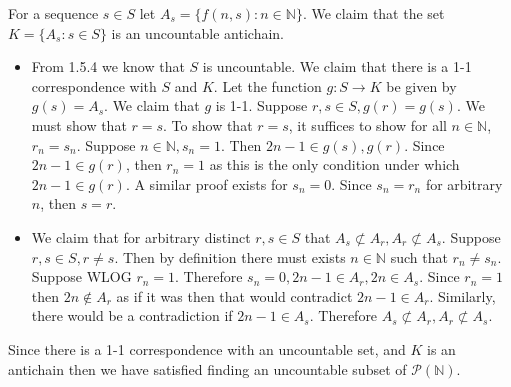 \documentclass[12pt, letterpaper]{article}
\newcommand{\N}{\mathbb{N}}
\newcommand{\Po}{\mathcal{P}}
\begin{document}
\begin{enumerate}
\begin{enumerate}
$$				$$
				For a sequence $s \in S$ let $A_s = \{f(n,s) : n \in \N\}$.  We claim that the set $K = \{A_s : s \in S\}$ is an uncountable antichain.  
				\begin{itemize}
					\item From 1.5.4 we know that $S$ is uncountable.  We claim that there is a 1-1 correspondence with $S$ and $K$.  Let the function $g: S \to K$ be given by $g(s) = A_s$. We claim that $g$ is 1-1.  Suppose $r,s \in S, g(r) = g(s)$.  We must show that $r = s$.  To show that $r=s$, it suffices to show for all $n \in \N$, $r_n = s_n$.  Suppose $n \in \N, s_n = 1$.  Then $2n-1 \in g(s), g(r)$.  Since $2n-1 \in g(r)$, then $r_n = 1$ as this is the only condition under which $2n-1 \in g(r)$.  A similar proof exists for $s_n = 0$.  Since $s_n = r_n$ for arbitrary $n$, then $s = r$.
					\item We claim that for arbitrary distinct $r,s \in S$ that $A_s \not \subset A_r, A_r \not \subset A_s$.  Suppose $r,s \in S, r \neq s$.  Then by definition there must exists $n \in \N$ such that $r_n \neq s_n$.  Suppose WLOG $r_n = 1$.  Therefore $s_n = 0, 2n - 1\in A_r, 2n \in A_s$.  Since $r_n = 1$ then $2n \not \in A_r$ as if it was then that would contradict $2n -1 \in A_r$.  Similarly, there would be a contradiction if $2n - 1 \in A_s$.  Therefore $A_s \not \subset A_r, A_r \not \subset A_s$.
				\end{itemize}
				Since there is a 1-1 correspondence with an uncountable set, and $K$ is an antichain then we have satisfied finding an uncountable subset of $\Po(\N)$.   
			\end{enumerate}
	\end{enumerate}
\end{document}
